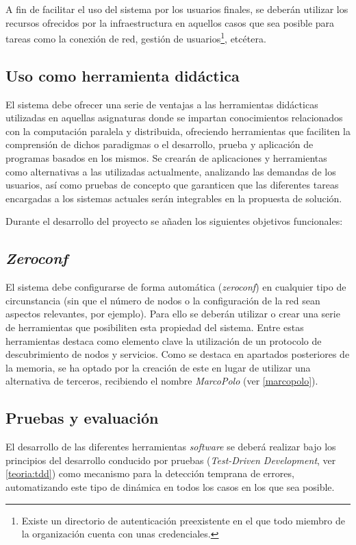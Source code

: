 A fin de facilitar el uso del sistema por los usuarios finales, se deberán utilizar los recursos ofrecidos por la infraestructura en aquellos casos que sea posible para tareas como la conexión de red, gestión de usuarios\footnote{Existe un directorio de autenticación preexistente en el que todo miembro de la organización cuenta con unas credenciales.}, etcétera.%

\subsection{Uso como herramienta didáctica}
\label{obj5}
El sistema debe ofrecer una serie de ventajas a las herramientas didácticas utilizadas en aquellas asignaturas donde se impartan conocimientos relacionados con la computación paralela y distribuida, ofreciendo herramientas que faciliten la comprensión de dichos paradigmas o el desarrollo, prueba y aplicación de programas basados en los mismos. Se crearán de aplicaciones y herramientas como alternativas a las utilizadas actualmente, analizando las demandas de los usuarios, así como pruebas de concepto que garanticen que las diferentes tareas encargadas a los sistemas actuales serán integrables en la propuesta de solución.

Durante el desarrollo del proyecto se añaden los siguientes objetivos funcionales:

\subsection{\textit{Zeroconf}}
\label{obj6}
El sistema debe configurarse de forma automática (\textit{zeroconf}) en cualquier tipo de circunstancia (sin que el número de nodos o la configuración de la red sean aspectos relevantes, por ejemplo). Para ello se deberán utilizar o crear una serie de herramientas que posibiliten esta propiedad del sistema. Entre estas herramientas destaca como elemento clave la utilización de un protocolo de descubrimiento de nodos y servicios. Como se destaca en apartados posteriores de la memoria, se ha optado por la creación de este en lugar de utilizar una alternativa de terceros, recibiendo el nombre \textit{MarcoPolo} (ver \ref{marcopolo}).

\subsection{Pruebas y evaluación}
\label{obj7}
El desarrollo de las diferentes herramientas \textit{software} se deberá realizar bajo los principios del desarrollo conducido por pruebas (\textit{Test-Driven Development}, ver \ref{teoria:tdd}) como mecanismo para la detección temprana de errores, automatizando este tipo de dinámica en todos los casos en los que sea posible.

